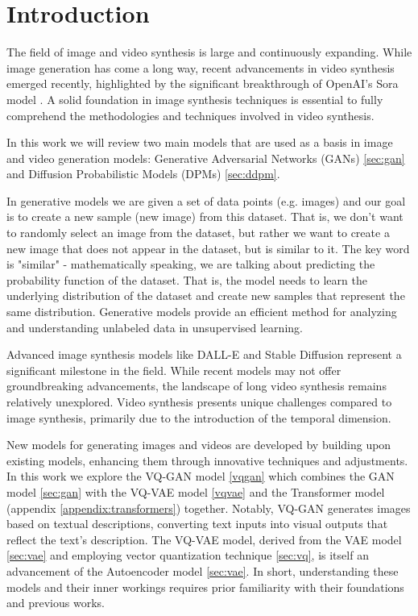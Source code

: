 \section{Introduction}

The field of image and video synthesis is large and continuously expanding. While image generation has come a long way, recent advancements in video synthesis emerged recently, highlighted by the significant breakthrough of OpenAI's Sora model \cite{sora_website}. A solid foundation in image synthesis techniques is essential to fully comprehend the methodologies and techniques involved in video synthesis.

In this work we will review two main models that are used as a basis in image and video generation models: Generative Adversarial Networks (GANs) \cite{gan} \ref{sec:gan} and Diffusion Probabilistic Models (DPMs) \cite{diffusion_models} \cite{ddpm} \ref{sec:ddpm}.

In generative models we are given a set of data points (e.g. images) and our goal is to create a new sample (new image) from this dataset. That is, we don't want to randomly select an image from the dataset, but rather we want to create a new image that does not appear in the dataset, but is similar to it. The key word is "similar" - mathematically speaking, we are talking about predicting the probability function of the dataset. That is, the model needs to learn the underlying distribution of the dataset and create new samples that represent the same distribution. Generative models provide an efficient method for analyzing and understanding unlabeled data in unsupervised learning.

Advanced image synthesis models like DALL-E \cite{dalle} and Stable Diffusion \cite{stable_diffusion} represent a significant milestone in the field. While recent models may not offer groundbreaking advancements, the landscape of long video synthesis remains relatively unexplored. Video synthesis presents unique challenges compared to image synthesis, primarily due to the introduction of the temporal dimension.

New models for generating images and videos are developed by building upon existing models, enhancing them through innovative techniques and adjustments. In this work we explore the VQ-GAN model \cite{vqgan} \ref{vqgan} which combines the GAN model \cite{gan} \ref{sec:gan} with the VQ-VAE model \cite{vqvae} \ref{vqvae} and the Transformer model \cite{transformer} (appendix \ref{appendix:transformers}) together. Notably, VQ-GAN generates images based on textual descriptions, converting text inputs into visual outputs that reflect the text's description. The VQ-VAE model, derived from the VAE model \cite{vae} \ref{sec:vae} and employing vector quantization technique \cite{vqvae} \ref{sec:vq}, is itself an advancement of the Autoencoder model \cite{autoencoder} \ref{sec:vae}. In short, understanding these models and their inner workings requires prior familiarity with their foundations and previous works.

